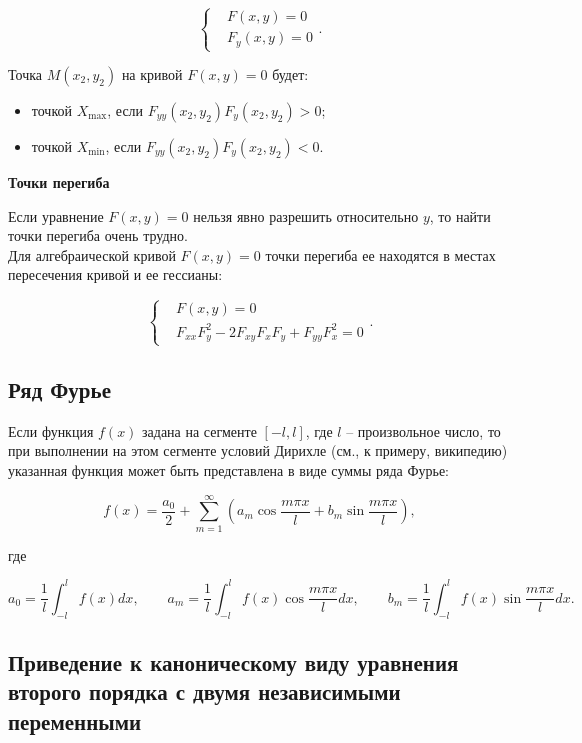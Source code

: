 \[
\begin{cases}
& F \left( x, y \right) = 0\\
& F_{y} \left( x, y \right) = 0
\end{cases}.
\]

Точка $M \left( x_{2}, y_{2} \right)$ на кривой $F \left( x, y \right) = 0$ будет:

\begin{itemize}
	\item точкой $X_{\max}$, если $F_{yy} \left( x_{2}, y_{2} \right) F_{y} \left( x_{2}, y_{2} \right) > 0$;
	
	\item точкой $X_{\min}$, если $F_{yy} \left( x_{2}, y_{2} \right) F_{y} \left( x_{2}, y_{2} \right) < 0$.
\end{itemize} 

\textbf{Точки перегиба}

Если уравнение $F \left( x, y \right) = 0$ нельзя явно разрешить относительно $y$, то найти точки перегиба очень трудно.\\

Для алгебраической кривой $F \left( x, y \right) = 0$ точки перегиба ее находятся в местах пересечения кривой и ее гессианы:

\[
\begin{cases}
& F \left( x, y \right) = 0\\
& F_{xx} F^{2}_{y} - 2 F_{xy} F_{x} F_{y} + F_{yy} F^{2}_{x} = 0
\end{cases}.
\]

\subsection{Ряд Фурье}

Если функция $f(x)$ задана на сегменте $[-l,l]$, где $l$ -- произвольное число, то при выполнении на этом сегменте условий Дирихле (см., к примеру, википедию) указанная функция может быть представлена в виде суммы ряда Фурье:

\[
f(x) = \frac{a_{0}}{2} + \sum_{m = 1}^{\infty} \left( a_{m} \cos \frac{m \pi x}{l} + b_{m} \sin \frac{m \pi x}{l} \right),
\]

где

\[
a_{0} =  \frac{1}{l} \int_{-l}^{l} f(x) dx, \qquad a_{m} = \frac{1}{l} \int_{-l}^{l} f(x) \cos \frac{m \pi x}{l} dx, \qquad b_{m} = \frac{1}{l} \int_{-l}^{l} f(x) \sin \frac{m \pi x}{l} dx.
\]

\subsection{Приведение к каноническому виду уравнения второго порядка с двумя независимыми переменными}


